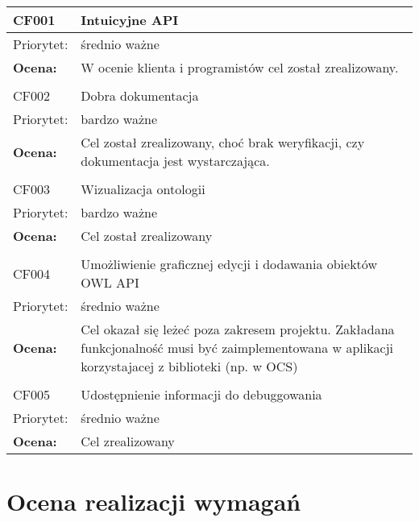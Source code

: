 \documentclass[a4paper,10pt]{article}
\begin{document}

\begin{center}

\begin{tabular}{|m{3cm}|m{9cm}|} \hline

CF001 & Intuicyjne API \\ \hline
Priorytet: & średnio ważne  \\ \hline
\textbf{Ocena:} & W ocenie klienta i programistów cel został zrealizowany. \\ \hline
\multicolumn{2}{c}{} \\

 \hline
CF002 & Dobra dokumentacja \\ \hline
Priorytet: & bardzo ważne \\ \hline
\textbf{Ocena:} & Cel został zrealizowany, choć brak weryfikacji, czy dokumentacja jest wystarczająca. \\ \hline
\multicolumn{2}{c}{} \\
 \hline
CF003 & Wizualizacja ontologii \\ \hline
Priorytet: & bardzo ważne \\ \hline
\textbf{Ocena:} & Cel został zrealizowany \\ \hline
\multicolumn{2}{c}{} \\
 \hline
CF004 & Umożliwienie graficznej edycji i dodawania obiektów OWL API \\ \hline
Priorytet: & średnio ważne \\ \hline
\textbf{Ocena:} & Cel okazał się leżeć poza zakresem projektu. Zakładana funkcjonalność musi być zaimplementowana w aplikacji korzystajacej z biblioteki (np. w OCS) \\ \hline
\multicolumn{2}{c}{} \\


 \hline

CF005 & Udostępnienie informacji do debuggowania  \\ \hline
Priorytet: & średnio ważne \\ \hline
\textbf{Ocena:} & Cel zrealizowany \\ \hline
\end{tabular}

\end{center}




\section{Ocena realizacji wymagań}
\end{document}
